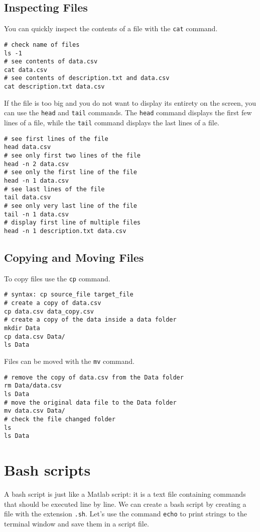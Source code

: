 \documentclass[12pt, a4paper]{article}
\begin{document}
\subsection{Inspecting Files}
\label{sec:orgf2226e4}
You can quickly inspect the contents of a file with the \texttt{cat} command.
\lstset{language=bash,label= ,caption= ,captionpos=b,firstnumber=1,numbers=left,style=bash}
\begin{lstlisting}
# check name of files
ls -1
# see contents of data.csv
cat data.csv
# see contents of description.txt and data.csv
cat description.txt data.csv
\end{lstlisting}
If the file is too big and you do not want to display its entirety on the screen, you can use the \texttt{head} and \texttt{tail} commands.
The \texttt{head} command displays the first few lines of a file, while the \texttt{tail} command displays the last lines of a file.
\lstset{language=bash,label= ,caption= ,captionpos=b,firstnumber=1,numbers=left,style=bash}
\begin{lstlisting}
# see first lines of the file
head data.csv
# see only first two lines of the file
head -n 2 data.csv
# see only the first line of the file
head -n 1 data.csv
# see last lines of the file
tail data.csv
# see only very last line of the file
tail -n 1 data.csv
# display first line of multiple files
head -n 1 description.txt data.csv
\end{lstlisting}
\subsection{Copying and Moving Files}
\label{sec:org239e73b}
To copy files use the \texttt{cp} command.
\lstset{language=bash,label= ,caption= ,captionpos=b,firstnumber=1,numbers=left,style=bash}
\begin{lstlisting}
# syntax: cp source_file target_file
# create a copy of data.csv
cp data.csv data_copy.csv
# create a copy of the data inside a data folder
mkdir Data
cp data.csv Data/
ls Data
\end{lstlisting}
Files can be moved with the \texttt{mv} command.
\lstset{language=bash,label= ,caption= ,captionpos=b,firstnumber=1,numbers=left,style=bash}
\begin{lstlisting}
# remove the copy of data.csv from the Data folder
rm Data/data.csv
ls Data
# move the original data file to the Data folder
mv data.csv Data/
# check the file changed folder
ls
ls Data
\end{lstlisting}
\section{Bash scripts}
\label{sec:orgcdaf319}
A bash script is just like a Matlab script: it is a text file containing commands that should be executed line by line.
We can create a bash script by creating a file with the extension \texttt{.sh}.
Let's use the command \texttt{echo} to print strings to the terminal window and save them in a script file.
\end{document}
